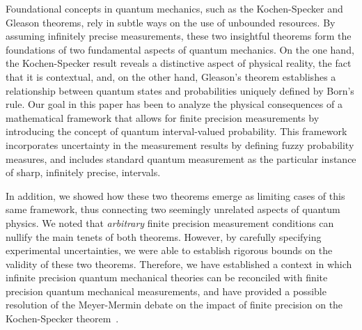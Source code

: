 \documentclass[english,reprint, aps, prl,superscriptaddress, showpacs,
showkeys, longbibliography, amsmath, amssymb, floatfix]{revtex4-1}
\theoremstyle{plain}
\theoremstyle{definition}
\newcommand{\says}[3]{\begin{framed}\begin{minipage}{0.9\linewidth}\color{#1}{#2 says: #3}\end{minipage}\end{framed}}
\newcommand{\andy}[1]{\says{blue}{Andy}{#1}}
\begin{document}
Foundational concepts in quantum mechanics, such as the Kochen-Specker
and Gleason theorems, rely in subtle ways on the use of
unbounded resources. By assuming infinitely precise measurements,
these two insightful theorems form the foundations of two fundamental aspects of
quantum mechanics. On the one hand, the Kochen-Specker result reveals a
distinctive aspect of physical reality, the fact that it is
contextual, and, on the other hand, Gleason's theorem establishes a
relationship between quantum states and probabilities uniquely defined
by Born's rule.  Our goal in this paper has been to analyze the
physical consequences of a mathematical framework that allows for
finite precision measurements by introducing the concept of quantum
interval-valued probability. This framework incorporates uncertainty
in the measurement results by defining fuzzy probability measures, and
includes standard quantum measurement as the particular instance of
sharp, infinitely precise, intervals.  

In addition, we showed how these two theorems emerge as limiting cases
of this same framework, thus connecting two seemingly unrelated
aspects of quantum physics. We noted that {\it arbitrary\/} finite
precision measurement conditions can nullify the main tenets of both
theorems. However, by carefully specifying experimental uncertainties,
we were able to establish rigorous bounds on the validity of these two
theorems. Therefore, we have established a context in which infinite
precision quantum mechanical theories can be reconciled with finite
precision quantum mechanical measurements, and have provided a
possible resolution of the Meyer-Mermin debate on the impact of finite
precision on the Kochen-Specker
theorem~\cite{PhysRevLett.83.3751,Mermin1999}.


% 

\end{document}
